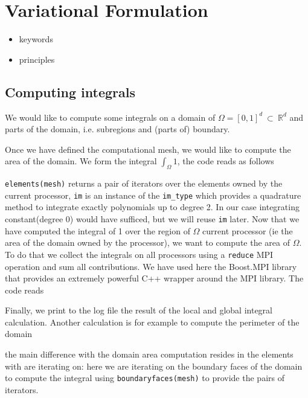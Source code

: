 \documentclass[11pt]{article}
\newcommand{\cpp}{C{\hspace{-.3em}\vspace{-.2em}\tiny++}\xspace}
\begin{document}
\section{Variational Formulation}
\label{sec:vari-form}

\begin{itemize}
\item keywords
\item principles
\end{itemize}

\subsection{Computing integrals}
\label{sec:computing-integrals}

We would like to compute some integrals on a domain of $\Omega=[0,1]^d\ \subset\ \mathbb{R}^d$
and parts of the domain, i.e. subregions and (parts of) boundary.

Once we have defined the computational mesh, we would like to compute
the area of the domain. We form the integral $\int_\Omega 1$, the code
reads as follows



\lstinline!elements(mesh)! returns a pair of iterators over the
elements owned by the current processor, \lstinline!im! is an instance
of the \lstinline!im_type! which provides a quadrature method to
integrate exactly polynomials up to degree 2. In our case integrating
constant(degree 0) would have sufficed, but we will reuse
\lstinline!im! later. Now that we have computed the integral of 1 over
the region of $\Omega$ current processor (ie the area of the domain
owned by the processor), we want to compute the area of $\Omega$. To
do that we collect the integrals on all processors using a
\lstinline!reduce! MPI operation and sum all contributions. We have
used here the Boost.MPI library that provides an extremely powerful
\cpp wrapper around the MPI library. The code reads



\noindent
Finally, we print to the log file the result of the local and global
integral calculation. Another calculation is for example to compute
the perimeter of the domain



\noindent
the main difference with the domain area computation resides in the
elements with are iterating on: here we are iterating on the boundary
faces of the domain to compute the integral using
\lstinline!boundaryfaces(mesh)! to provide the pairs of iterators.
\end{document}
